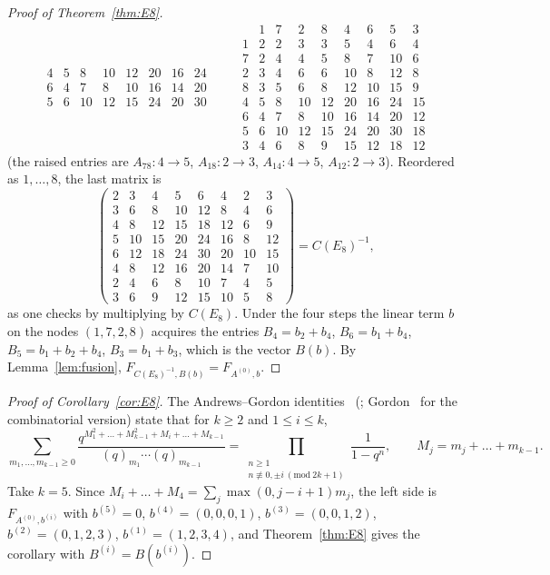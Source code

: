 \documentclass[11pt]{amsart}
\theoremstyle{definition}
\numberwithin{equation}{section}
\begin{document}
\begin{proof}[Proof of Theorem~\ref{thm:E8}]
\[\begin{array}{c|ccccccc}
4&5&8&10&12&20&16&24\\6&4&7&8&10&16&14&20\\5&6&10&12&15&24&20&30
\end{array}
\qquad
\begin{array}{c|cccccccc}
&1&7&2&8&4&6&5&3\\\hline
1&2&2&3&3&5&4&6&4\\7&2&4&4&5&8&7&10&6\\2&3&4&6&6&10&8&12&8\\8&3&5&6&8&12&10&15&9\\
4&5&8&10&12&20&16&24&15\\6&4&7&8&10&16&14&20&12\\5&6&10&12&15&24&20&30&18\\3&4&6&8&9&15&12&18&12
\end{array}
\]
(the raised entries are $A_{78}:4\to5$, $A_{18}:2\to3$, $A_{14}:4\to5$, $A_{12}:2\to3$). Reordered as
$1,\dots,8$, the last matrix is
\[
\begin{pmatrix}
2&3&4&5&6&4&2&3\\3&6&8&10&12&8&4&6\\4&8&12&15&18&12&6&9\\5&10&15&20&24&16&8&12\\
6&12&18&24&30&20&10&15\\4&8&12&16&20&14&7&10\\2&4&6&8&10&7&4&5\\3&6&9&12&15&10&5&8
\end{pmatrix}=C(E_8)^{-1},
\]
as one checks by multiplying by $C(E_8)$. Under the four steps the linear term $b$ on the nodes
$(1,7,2,8)$ acquires the entries $B_4=b_2+b_4$, $B_6=b_1+b_4$, $B_5=b_1+b_2+b_4$, $B_3=b_1+b_3$, which is the
vector $B(b)$. By Lemma~\ref{lem:fusion}, $F_{C(E_8)^{-1},B(b)}=F_{A^{(0)},b}$.
\end{proof}

\begin{proof}[Proof of Corollary~\ref{cor:E8}]
The Andrews--Gordon identities~\cite[Theorem~1]{Andrews74} (\cite[Theorem~7.8]{AndrewsBook};
Gordon~\cite{Gordon} for the combinatorial version) state that for $k\ge2$ and $1\le i\le k$,
\[
\sum_{m_1,\dots,m_{k-1}\ge0}\frac{q^{M_1^2+\dots+M_{k-1}^2+M_i+\dots+M_{k-1}}}{(q)_{m_1}\cdots(q)_{m_{k-1}}}
=\prod_{\substack{n\ge1\\n\not\equiv0,\pm i\ (\mathrm{mod}\ 2k+1)}}\frac1{1-q^n},\qquad M_j=m_j+\dots+m_{k-1}.
\]
Take $k=5$. Since $M_i+\dots+M_4=\sum_j\max(0,j-i+1)m_j$, the left side is $F_{A^{(0)},b^{(i)}}$ with
$b^{(5)}=0$, $b^{(4)}=(0,0,0,1)$, $b^{(3)}=(0,0,1,2)$, $b^{(2)}=(0,1,2,3)$, $b^{(1)}=(1,2,3,4)$, and
Theorem~\ref{thm:E8} gives the corollary with $B^{(i)}=B(b^{(i)})$.
\end{proof}
\end{document}
